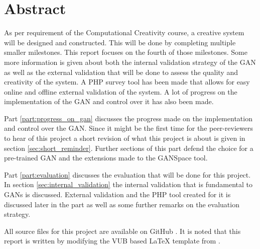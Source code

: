 \chapter*{Abstract}
As per requirement of the Computational Creativity course, a creative system will be designed and constructed.
This will be done by completing multiple smaller milestones.
This report focuses on the fourth of those milestones.
Some more information is given about both the internal validation strategy of the GAN as well as the external validation that will be done to assess the quality and creativity of the system.
A PHP survey tool has been made that allows for easy online and offline external validation of the system.
A lot of progress on the implementation of the GAN and control over it has also been made.

Part \ref{part:progress_on_gan} discusses the progress made on the implementation and control over the GAN. 
Since it might be the first time for the peer-reviewers to hear of this project a short revision of what this project is about is given in section \ref{sec:short_reminder}. 
Further sections of this part defend the choice for a pre-trained GAN and the extensions made to the GANSpace tool.

Part \ref{part:evaluation} discusses the evaluation that will be done for this project.
In section \ref{sec:internal_validation} the internal validation that is fundamental to GANs is discussed.
External validation and the PHP tool created for it is discussed later in the part as well as some further remarks on the evaluation strategy.

All source files for this project are available on GitHub \citep{github_project}. It is noted that this report is written by modifying the VUB based \LaTeX{} template from \citet{latex_template}. 
